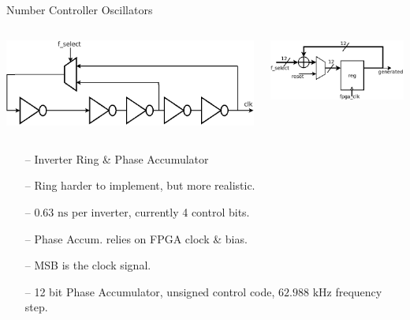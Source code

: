 \documentclass{beamer}
\begin{document}
\begin{frame}{Number Controller Oscillators}
  	\begin{columns}
    \begin{center}
  	\includegraphics[scale=0.175]{../inverter_chain}
    \end{center}
    \begin{center}
    \includegraphics[scale=0.325]{../phase_accum}
    \end{center}
    \end{columns}
    \vspace{1 cm}	
	\begin{itemize}
		\item[--]
            Inverter Ring \& Phase Accumulator
        \item[--]
            Ring harder to implement, but more realistic.
        \item[--]
            $0.63\textrm{ ns}$ per inverter, currently 4 control bits.
        \item[--]
        	Phase Accum. relies on FPGA clock \& bias.
        \item[--]
            MSB is the clock signal.
        \item[--]
        	12 bit Phase Accumulator, unsigned control code, $62.988\textrm{ kHz}$ frequency step.
    \end{itemize}
\end{frame}
\end{document}
